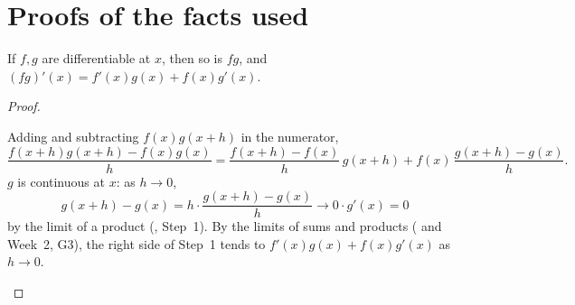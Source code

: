 \documentclass[10pt]{scrartcl}
\begin{document}
\clearpage
\section{Proofs of the facts used}

\begin{proposition*}
  If $f,g$ are differentiable at $x$, then so is $fg$, and $(fg)'(x)=f'(x)g(x)+f(x)g'(x)$.
\end{proposition*}
\begin{proof}
  \begin{steps}
    \ii Adding and subtracting $f(x)g(x+h)$ in the numerator,
    \[
      \frac{f(x+h)g(x+h)-f(x)g(x)}{h}=\frac{f(x+h)-f(x)}{h}\,g(x+h)+f(x)\,\frac{g(x+h)-g(x)}{h}.
    \]
    \ii $g$ is continuous at $x$: as $h\to0$,
    \[
      g(x+h)-g(x)=h\cdot\frac{g(x+h)-g(x)}{h}\to0\cdot g'(x)=0
    \]
    by the limit of a product (, Step~1).
    \ii By the limits of sums and products ( and Week~2, G3), the right side of Step~1 tends to $f'(x)g(x)+f(x)g'(x)$ as $h\to0$.
  \end{steps}
\end{proof}
\end{document}
